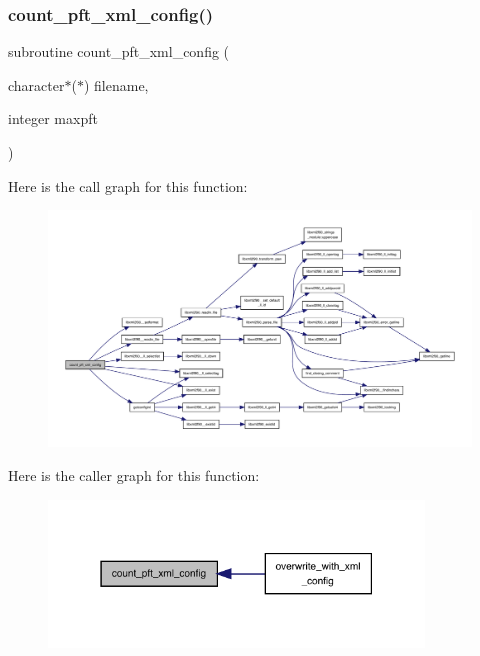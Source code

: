\subsubsection{\texorpdfstring{count\+\_\+pft\+\_\+xml\+\_\+config()}{count\_pft\_xml\_config()}}
{\footnotesize\ttfamily subroutine count\+\_\+pft\+\_\+xml\+\_\+config (\begin{DoxyParamCaption}\item[{character$\ast$($\ast$)}]{filename,  }\item[{integer}]{maxpft }\end{DoxyParamCaption})}

Here is the call graph for this function\+:
\nopagebreak
\begin{figure}[H]
\begin{center}
\leavevmode
\includegraphics[width=350pt]{ed__xml__config_8f90_a86b17f0ea1e5298fb9d4747819cf4f10_cgraph}
\end{center}
\end{figure}
Here is the caller graph for this function\+:
\nopagebreak
\begin{figure}[H]
\begin{center}
\leavevmode
\includegraphics[width=283pt]{ed__xml__config_8f90_a86b17f0ea1e5298fb9d4747819cf4f10_icgraph}
\end{center}
\end{figure}
\mbox{\label{ed__xml__config_8f90_a949b85c800477675f7d27e9e02d2d501}} 
